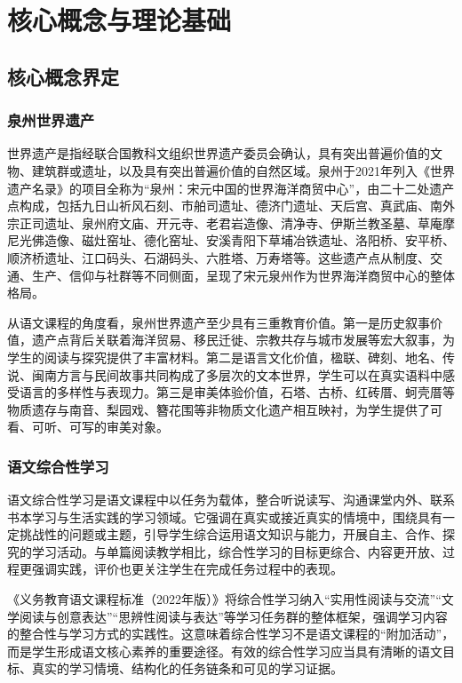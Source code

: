 \chapter{核心概念与理论基础}

\section{核心概念界定}

\subsection{泉州世界遗产}

世界遗产是指经联合国教科文组织世界遗产委员会确认，具有突出普遍价值的文物、建筑群或遗址，以及具有突出普遍价值的自然区域。泉州于2021年列入《世界遗产名录》的项目全称为“泉州：宋元中国的世界海洋商贸中心”，由二十二处遗产点构成，包括九日山祈风石刻、市舶司遗址、德济门遗址、天后宫、真武庙、南外宗正司遗址、泉州府文庙、开元寺、老君岩造像、清净寺、伊斯兰教圣墓、草庵摩尼光佛造像、磁灶窑址、德化窑址、安溪青阳下草埔冶铁遗址、洛阳桥、安平桥、顺济桥遗址、江口码头、石湖码头、六胜塔、万寿塔等。这些遗产点从制度、交通、生产、信仰与社群等不同侧面，呈现了宋元泉州作为世界海洋商贸中心的整体格局\cite{quanzhou2021}。

从语文课程的角度看，泉州世界遗产至少具有三重教育价值。第一是历史叙事价值，遗产点背后关联着海洋贸易、移民迁徙、宗教共存与城市发展等宏大叙事，为学生的阅读与探究提供了丰富材料。第二是语言文化价值，楹联、碑刻、地名、传说、闽南方言与民间故事共同构成了多层次的文本世界，学生可以在真实语料中感受语言的多样性与表现力。第三是审美体验价值，石塔、古桥、红砖厝、蚵壳厝等物质遗存与南音、梨园戏、簪花围等非物质文化遗产相互映衬，为学生提供了可看、可听、可写的审美对象。

\subsection{语文综合性学习}

语文综合性学习是语文课程中以任务为载体，整合听说读写、沟通课堂内外、联系书本学习与生活实践的学习领域。它强调在真实或接近真实的情境中，围绕具有一定挑战性的问题或主题，引导学生综合运用语文知识与能力，开展自主、合作、探究的学习活动\cite{wangning2016}。与单篇阅读教学相比，综合性学习的目标更综合、内容更开放、过程更强调实践，评价也更关注学生在完成任务过程中的表现。

《义务教育语文课程标准（2022年版）》将综合性学习纳入“实用性阅读与交流”“文学阅读与创意表达”“思辨性阅读与表达”等学习任务群的整体框架，强调学习内容的整合性与学习方式的实践性\cite{jiaoyubu2022}。这意味着综合性学习不是语文课程的“附加活动”，而是学生形成语文核心素养的重要途径。有效的综合性学习应当具有清晰的语文目标、真实的学习情境、结构化的任务链条和可见的学习证据。

